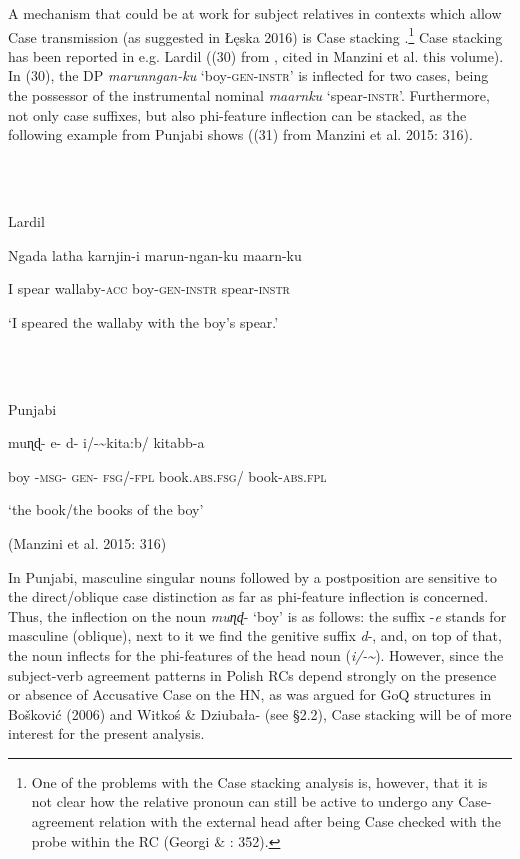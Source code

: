 \documentclass[output=paper]{langsci/langscibook}
\begin{document}
A mechanism that could be at work for subject relatives in contexts which allow Case transmission (as suggested in Łęska 2016) is Case stacking \citep{Vogel2001}.\footnote{One of the problems with the Case stacking analysis is, however, that it is not clear how the relative pronoun can still be active to undergo any Case-agreement relation with the external head after being Case checked with the probe within the RC (Georgi \& \citealt{Salzmann2014}: 352).} Case stacking has been reported in e.g. Lardil ((30) from \citealt{Richards2013}, cited in Manzini et al. this volume). In (30), the DP \textit{marunngan-ku} ‘boy-\textsc{gen-instr}’ is inflected for two cases, being the possessor of the instrumental nominal \textit{maarnku} ‘spear\textsc{{}-instr}’. Furthermore, not only case suffixes, but also phi-feature inflection can be stacked, as the following example from Punjabi shows ((31) from Manzini et al. 2015: 316). 

\ea%
    \label{ex:key:30}
    \gll\\
        \\
    \glt
    \z

          Lardil

Ngada   latha   karnjin-i   marun-ngan-ku   maarn-ku   

  I     spear   wallaby-\textsc{acc} boy-\textsc{gen-instr}   spear-\textsc{instr}

  ‘I speared the wallaby with the boy’s spear.’

\ea%
    \label{ex:key:31}
    \gll\\
        \\
    \glt
    \z

          Punjabi

muɳɖ- e-   d-   i/-\~     kita:b/      kitabb-a       

  boy   {}-\textsc{msg}{}- \textsc{gen}{}-   \textsc{fsg}/-\textsc{fpl}   book.\textsc{abs.fsg}/   book-\textsc{abs.fpl}

  ‘the book/the books of the boy’                

(Manzini et al. 2015: 316)

In Punjabi, masculine singular nouns followed by a postposition are sensitive to the direct/oblique case distinction as far as phi-feature inflection is concerned. Thus, the inflection on the noun \textit{muɳɖ}{}- ‘boy’ is as follows: the suffix -\textit{e} stands for masculine (oblique), next to it we find the genitive suffix \textit{d}{}-, and, on top of that, the noun inflects for the phi-features of the head noun (\textit{i/-\~}). However, since the subject-verb agreement patterns in Polish RCs depend strongly on the presence or absence of Accusative Case on the HN, as was argued for GoQ structures in Bošković (2006) and Witkoś \& Dziubała-\citealt{Szrejbrowska2016} (see §2.2), Case stacking will be of more interest for the present analysis. 
\end{document}
